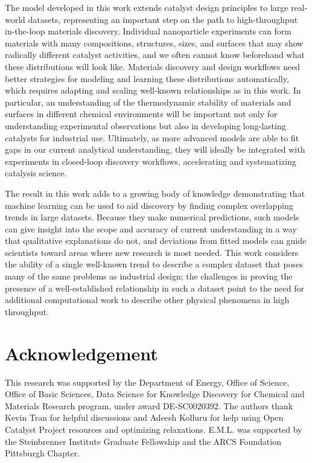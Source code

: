 \documentclass[preprint,12pt]{elsarticle}
\begin{document}
The model developed in this work extends catalyst design principles to large real-world datasets, representing an important step on the path to high-throughput in-the-loop materials discovery. Individual nanoparticle experiments can form materials with many compositions, structures, sizes, and surfaces that may show radically different catalyst activities, and we often cannot know beforehand what these distributions will look like. Materials discovery and design workflows need better strategies for modeling and learning these distributions automatically, which requires adapting and scaling well-known relationships as in this work. In particular, an understanding of the thermodynamic stability of materials and surfaces in different chemical environments will be important not only for understanding experimental observations but also in developing long-lasting catalysts for industrial use. Ultimately, as more advanced models are able to fit gaps in our current analytical understanding, they will ideally be integrated with experiments in closed-loop discovery workflows, accelerating and systematizing catalysis science.

The result in this work adds to a growing body of knowledge demonstrating that machine learning can be used to aid discovery by finding complex overlapping trends in large datasets. Because they make numerical predictions, such models can give insight into the scope and accuracy of current understanding in a way that qualitative explanations do not, and deviations from fitted models can guide scientists toward areas where new research is most needed. This work considers the ability of a single well-known trend to describe a complex dataset that poses many of the same problems as industrial design; the challenges in proving the presence of a well-established relationship in such a dataset point to the need for additional computational work to describe other physical phenomena in high throughput.


\section{Acknowledgement}
This research was supported by the Department of Energy, Office of Science, Office of Basic Sciences, Data Science for Knowledge Discovery for Chemical and Materials Research program, under award DE-SC0020392. The authors thank Kevin Tran for helpful discussions and Adeesh Kolluru for help using Open Catalyst Project resources and optimizing relaxations. E.M.L. was supported by the Steinbrenner Institute Graduate Fellowship and the ARCS Foundation Pittsburgh Chapter.
\end{document}
